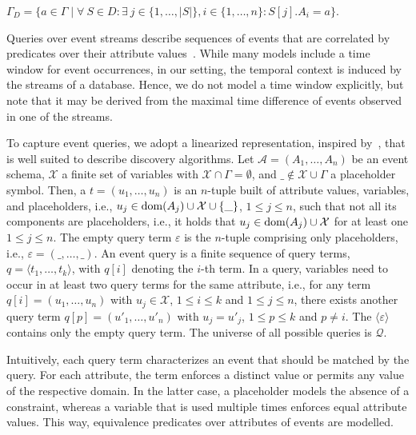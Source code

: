 $\Gamma_D = \{a \in \Gamma \mid \forall \ S \in D: \exists \
j\in\{1,\dots,|S|\}, i\in\{1,\dots,n\}: S[j].A_i = a\}$.


Queries over event streams describe sequences of events that are
correlated by predicates over their attribute
values~\cite{DBLP:conf/sigmod/ZhangDI14,DBLP:journals/vldb/GiatrakosAADG20}.
While many models include a time window for event occurrences, in our
setting, the temporal
context is induced by the streams of a database.
{Hence, we
do not model a time window explicitly, but note that it may be derived from
the maximal time difference of events observed in one of the streams.}


To capture event queries, we adopt a linearized
representation,
inspired by~\cite{DBLP:conf/btw/Kleest-Meissner23},
that is well suited to describe discovery algorithms.
Let $\mathcal{A} =
(A_1, \ldots, A_n)$ be an event schema, $\mathcal{X}$ a finite set of variables
with $\mathcal{X}\cap
\Gamma=\emptyset$, and $\_ \notin \mathcal{X}\cup
\Gamma$ a placeholder symbol. Then, a 
$t=(u_{1},\ldots,u_{n})$ is an $n$-tuple built of attribute
values, variables, and placeholders, i.e.,
$u_{j}\in \operatorname{dom}(A_j) \cup \mathcal{X} \cup \{ \_ \}$, $1\leq j\leq n$, such that
not all its components are placeholders, i.e., it holds that $u_{j}\in
\operatorname{dom}(A_j) \cup \mathcal{X}$ for at least one $1\leq j\leq n$.
The empty query term $\varepsilon$ is the $n$-tuple comprising only
placeholders, i.e., 
$\varepsilon=(\_,\dots,\_)$.
An event
query is a finite sequence of query terms, $q=\langle t_1,\ldots,t_k \rangle$,
with $q[i]$ denoting the $i$-th term. In a query, variables need to occur in at
least two query terms for the same attribute, i.e., for any term
$q[i]=(u_{1},\ldots,u_{n})$ with $u_j\in \mathcal{X}$,
$1\leq i\leq k$ and $1\leq j\leq n$, there exists another query term
$q[p]=(u'_{1},\ldots,u'_{n})$ with $u_j = u'_j$,
$1\leq p\leq k$ and $p\neq i$. The 
$\langle\varepsilon\rangle$ contains only the empty query term.
The universe of all possible queries is $\mathcal{Q}$.




Intuitively, each query term characterizes an event that should be matched by
the query. For each attribute, the term enforces a distinct value or
permits any value of the respective domain. In the latter case, a placeholder
models the absence of a constraint, whereas a variable that is used multiple
times enforces equal attribute values.
This way, equivalence
predicates over attributes of events are modelled.


